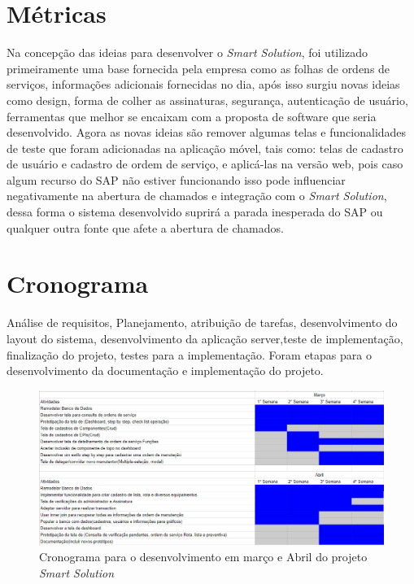 \newpage
	


\section{Métricas}

Na concepção das ideias para desenvolver o \textit{Smart Solution}, foi utilizado primeiramente uma base fornecida pela empresa como as folhas de ordens de serviços, informações adicionais fornecidas no dia, após isso surgiu novas ideias como design, forma de colher as assinaturas, segurança, autenticação de usuário, ferramentas que melhor se encaixam com a proposta de software que seria desenvolvido. Agora as novas ideias são remover algumas telas e funcionalidades de teste que foram adicionadas na aplicação móvel, tais como: telas de cadastro de usuário e cadastro de ordem de serviço, e aplicá-las na versão web, pois caso algum recurso do SAP não estiver funcionando isso pode influenciar negativamente na abertura de chamados e integração com o \textit{Smart Solution}, dessa forma o sistema desenvolvido suprirá a parada inesperada do SAP ou qualquer outra fonte que afete a abertura de chamados. 
\newpage
\section{Cronograma}
Análise de requisitos, Planejamento, atribuição de tarefas,
desenvolvimento do layout do sistema, desenvolvimento da aplicação server,teste de implementação, finalização do projeto, testes para a implementação. Foram etapas para o desenvolvimento da documentação e implementação do projeto.


\begin{figure}[H]
	\caption{\label{Cronograma_marco_e_Abril}Cronograma para o desenvolvimento em março e Abril do projeto \textit{Smart Solution}}
	\begin{center}
		\includegraphics[scale=0.85,angle=90]{./Figuras/Cronograma_marco_e_Abril}
	\end{center}
	
\end{figure}

